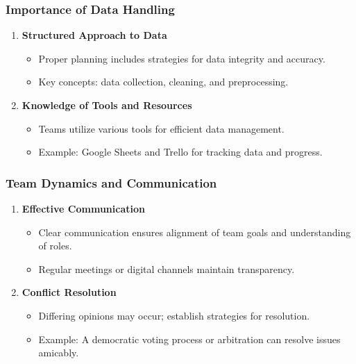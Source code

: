 \documentclass[aspectratio=169]{beamer}
\begin{document}
\begin{frame}[fragile]
    \frametitle{Importance of Data Handling}
    \begin{enumerate}
        \item \textbf{Structured Approach to Data}
        \begin{itemize}
            \item Proper planning includes strategies for data integrity and accuracy.
            \item Key concepts: data collection, cleaning, and preprocessing.
        \end{itemize}
        
        \item \textbf{Knowledge of Tools and Resources}
        \begin{itemize}
            \item Teams utilize various tools for efficient data management.
            \item Example: Google Sheets and Trello for tracking data and progress.
        \end{itemize}
    \end{enumerate}
\end{frame}

\begin{frame}[fragile]
    \frametitle{Team Dynamics and Communication}
    \begin{enumerate}
        \item \textbf{Effective Communication}
        \begin{itemize}
            \item Clear communication ensures alignment of team goals and understanding of roles.
            \item Regular meetings or digital channels maintain transparency.
        \end{itemize}
        
        \item \textbf{Conflict Resolution}
        \begin{itemize}
            \item Differing opinions may occur; establish strategies for resolution.
            \item Example: A democratic voting process or arbitration can resolve issues amicably.
        \end{itemize}
    \end{enumerate}
\end{frame}
\end{document}
